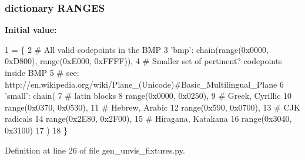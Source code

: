 \subsubsection[{R\+A\+N\+G\+E\+S}]{\setlength{\rightskip}{0pt plus 5cm}dictionary R\+A\+N\+G\+E\+S}\label{namespacegen__unvis__fixtures_a1d6cacc633c3322b7e7c67c3dab28ceb}
{\bfseries Initial value\+:}
\begin{DoxyCode}
1 = \{
2     \textcolor{comment}{# All valid codepoints in the BMP}
3     \textcolor{stringliteral}{'bmp'}: chain(range(0x0000, 0xD800), range(0xE000, 0xFFFF)),
4     \textcolor{comment}{# Smaller set of pertinent? codepoints inside BMP}
5     \textcolor{comment}{# see: http://en.wikipedia.org/wiki/Plane\_(Unicode)#Basic\_Multilingual\_Plane}
6     \textcolor{stringliteral}{'small'}: chain(
7         \textcolor{comment}{# latin blocks}
8         range(0x0000, 0x0250),
9         \textcolor{comment}{# Greek, Cyrillic}
10         range(0x0370, 0x0530),
11         \textcolor{comment}{# Hebrew, Arabic}
12         range(0x590, 0x0700),
13         \textcolor{comment}{# CJK radicals}
14         range(0x2E80, 0x2F00),
15         \textcolor{comment}{# Hiragana, Katakana}
16         range(0x3040, 0x3100)
17     )
18 \}
\end{DoxyCode}


Definition at line 26 of file gen\+\_\+unvis\+\_\+fixtures.\+py.

